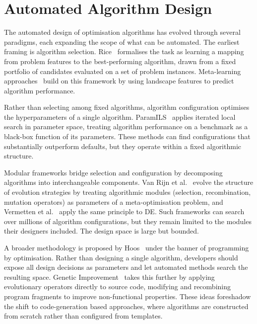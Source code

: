
\section{Automated Algorithm Design}
\label{sec:bg-aad}

The automated design of optimisation algorithms has evolved through several paradigms, each expanding the scope of what can be automated. The earliest framing is algorithm selection. Rice~\cite{rice1976algorithmselection} formalises the task as learning a mapping from problem features to the best-performing algorithm, drawn from a fixed portfolio of candidates evaluated on a set of problem instances. Meta-learning approaches~\cite{smithmiles2009meta} build on this framework by using landscape features to predict algorithm performance.

Rather than selecting among fixed algorithms, algorithm configuration optimises the hyperparameters of a single algorithm. ParamILS~\cite{hutter2009paramils} applies iterated local search in parameter space, treating algorithm performance on a benchmark as a black-box function of its parameters. These methods can find configurations that substantially outperform defaults, but they operate within a fixed algorithmic structure.

Modular frameworks bridge selection and configuration by decomposing algorithms into interchangeable components. Van Rijn et al.~\cite{vanRijn2016modular} evolve the structure of evolution strategies by treating algorithmic modules (selection, recombination, mutation operators) as parameters of a meta-optimisation problem, and Vermetten et al.~\cite{vermetten2023modde} apply the same principle to DE. Such frameworks can search over millions of algorithm configurations, but they remain limited to the modules their designers included. The design space is large but bounded.

A broader methodology is proposed by Hoos~\cite{hoos2012pbo} under the banner of programming by optimisation. Rather than designing a single algorithm, developers should expose all design decisions as parameters and let automated methods search the resulting space. Genetic Improvement~\cite{petke2018gi} takes this further by applying evolutionary operators directly to source code, modifying and recombining program fragments to improve non-functional properties. These ideas foreshadow the shift to code-generation based approaches, where algorithms are constructed from scratch rather than configured from templates.

